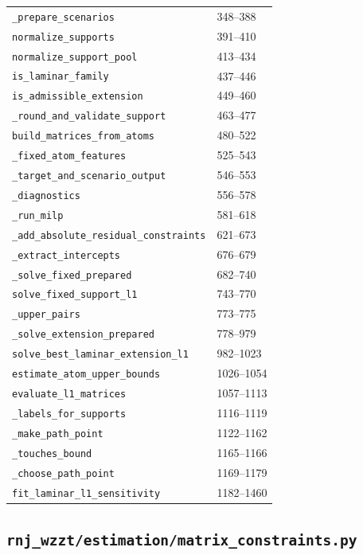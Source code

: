 \begin{longtable}{P{0.73\textwidth}P{0.18\textwidth}}
\nolinkurl{_prepare_scenarios} & 348--388 \\
\nolinkurl{normalize_supports} & 391--410 \\
\nolinkurl{normalize_support_pool} & 413--434 \\
\nolinkurl{is_laminar_family} & 437--446 \\
\nolinkurl{is_admissible_extension} & 449--460 \\
\nolinkurl{_round_and_validate_support} & 463--477 \\
\nolinkurl{build_matrices_from_atoms} & 480--522 \\
\nolinkurl{_fixed_atom_features} & 525--543 \\
\nolinkurl{_target_and_scenario_output} & 546--553 \\
\nolinkurl{_diagnostics} & 556--578 \\
\nolinkurl{_run_milp} & 581--618 \\
\nolinkurl{_add_absolute_residual_constraints} & 621--673 \\
\nolinkurl{_extract_intercepts} & 676--679 \\
\nolinkurl{_solve_fixed_prepared} & 682--740 \\
\nolinkurl{solve_fixed_support_l1} & 743--770 \\
\nolinkurl{_upper_pairs} & 773--775 \\
\nolinkurl{_solve_extension_prepared} & 778--979 \\
\nolinkurl{solve_best_laminar_extension_l1} & 982--1023 \\
\nolinkurl{estimate_atom_upper_bounds} & 1026--1054 \\
\nolinkurl{evaluate_l1_matrices} & 1057--1113 \\
\nolinkurl{_labels_for_supports} & 1116--1119 \\
\nolinkurl{_make_path_point} & 1122--1162 \\
\nolinkurl{_touches_bound} & 1165--1166 \\
\nolinkurl{_choose_path_point} & 1169--1179 \\
\nolinkurl{fit_laminar_l1_sensitivity} & 1182--1460 \\
\bottomrule\end{longtable}
\subsection{\texorpdfstring{\nolinkurl{rnj_wzzt/estimation/matrix_constraints.py}}{rnj\_wzzt/estimation/matrix\_constraints.py}}\label{module:estimation.matrix_constraints}
